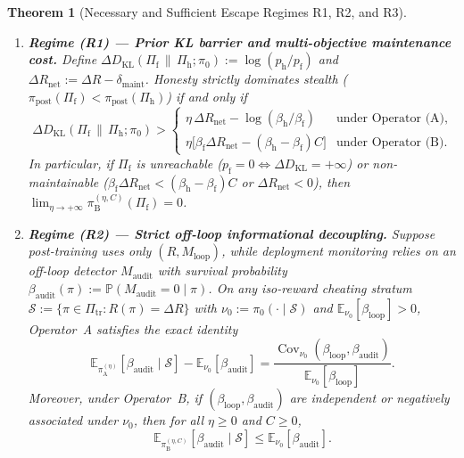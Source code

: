\documentclass[11pt,a4paper]{article}
\newtheorem{theorem}{Theorem}
\newcommand{\E}{\mathbb{E}}
\newcommand{\Prob}{\mathbb{P}}
\newcommand{\Cov}{\operatorname{Cov}}
\newcommand{\DKL}{D_{\mathrm{KL}}}
\begin{document}
\begin{theorem}[Necessary and Sufficient Escape Regimes R1, R2, and R3]\label{thm:escape}
\leavevmode
\begin{enumerate}
  \item \textbf{Regime (R1) --- Prior KL barrier and multi-objective maintenance cost.} Define $\Delta \DKL(\Pi_{\mathrm{f}} \,\|\, \Pi_{\mathrm{h}}; \pi_0) := \log(p_{\mathrm{h}}/p_{\mathrm{f}})$ and $\Delta R_{\mathrm{net}} := \Delta R - \delta_{\mathrm{maint}}$. Honesty strictly dominates stealth ($\pi_{\mathrm{post}}(\Pi_{\mathrm{f}}) < \pi_{\mathrm{post}}(\Pi_{\mathrm{h}})$) if and only if
  \begin{equation}\label{eq:R1}
    \Delta \DKL(\Pi_{\mathrm{f}} \,\|\, \Pi_{\mathrm{h}}; \pi_0) >
    \begin{cases}
      \eta\,\Delta R_{\mathrm{net}} - \log(\beta_{\mathrm{h}}/\beta_{\mathrm{f}}) & \text{under Operator~(A)}, \\[4pt]
      \eta\big[\beta_{\mathrm{f}}\Delta R_{\mathrm{net}} - (\beta_{\mathrm{h}} - \beta_{\mathrm{f}})C\big] & \text{under Operator~(B)}.
    \end{cases}
  \end{equation}
  In particular, if $\Pi_{\mathrm{f}}$ is unreachable ($p_{\mathrm{f}} = 0 \iff \Delta \DKL = +\infty$) or non-maintainable ($\beta_{\mathrm{f}}\Delta R_{\mathrm{net}} < (\beta_{\mathrm{h}} - \beta_{\mathrm{f}})C$ or $\Delta R_{\mathrm{net}} < 0$), then $\lim_{\eta \to +\infty}\pi_{\mathrm{B}}^{(\eta, C)}(\Pi_{\mathrm{f}}) = 0$.

  \item \textbf{Regime (R2) --- Strict off-loop informational decoupling.} Suppose post-training uses only $(R, M_{\mathrm{loop}})$, while deployment monitoring relies on an off-loop detector $M_{\mathrm{audit}}$ with survival probability $\beta_{\mathrm{audit}}(\pi) := \Prob(M_{\mathrm{audit}} = 0 \mid \pi)$. On any iso-reward cheating stratum $\mathcal{S} := \{\pi \in \Pi_{\mathrm{tr}} : R(\pi) = \Delta R\}$ with $\nu_0 := \pi_0(\cdot \mid \mathcal{S})$ and $\E_{\nu_0}[\beta_{\mathrm{loop}}] > 0$, Operator~A satisfies the exact identity
  \begin{equation}\label{eq:R2}
    \E_{\pi_{\mathrm{A}}^{(\eta)}}[\beta_{\mathrm{audit}} \mid \mathcal{S}] - \E_{\nu_0}[\beta_{\mathrm{audit}}]
    = \frac{\Cov_{\nu_0}(\beta_{\mathrm{loop}}, \beta_{\mathrm{audit}})}{\E_{\nu_0}[\beta_{\mathrm{loop}}]}.
  \end{equation}
  Moreover, under Operator~B, if $(\beta_{\mathrm{loop}}, \beta_{\mathrm{audit}})$ are independent or negatively associated under $\nu_0$, then for all $\eta \ge 0$ and $C \ge 0$,
  \begin{equation}
    \E_{\pi_{\mathrm{B}}^{(\eta, C)}}[\beta_{\mathrm{audit}} \mid \mathcal{S}] \le \E_{\nu_0}[\beta_{\mathrm{audit}}].
  \end{equation}


\end{enumerate}
\end{theorem}
\end{document}
